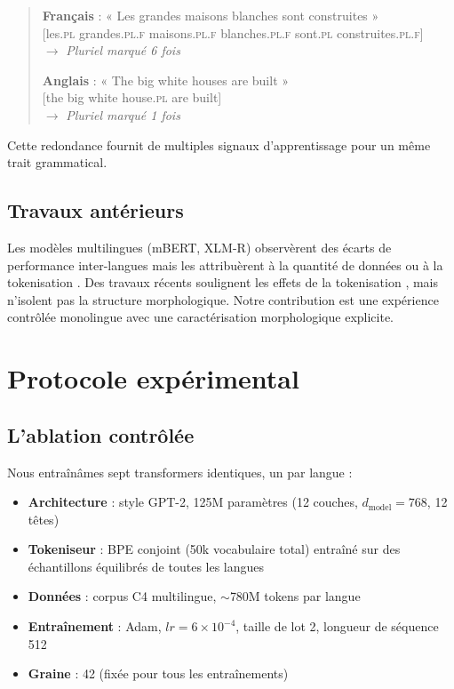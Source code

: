 \documentclass[11pt]{article}
\begin{document}
\begin{quote}
\textbf{Français} : « Les grandes maisons blanches sont construites »\\
\hspace*{1cm}[les.\textsc{pl} grandes.\textsc{pl.f} maisons.\textsc{pl.f} blanches.\textsc{pl.f} sont.\textsc{pl} construites.\textsc{pl.f}]\\
\hspace*{1cm}$\rightarrow$ \textit{Pluriel marqué 6 fois}

\textbf{Anglais} : « The big white houses are built »\\
\hspace*{1cm}[the big white house.\textsc{pl} are built]\\
\hspace*{1cm}$\rightarrow$ \textit{Pluriel marqué 1 fois}
\end{quote}

Cette redondance fournit de multiples signaux d'apprentissage pour un même trait grammatical.

\subsection{Travaux antérieurs}

Les modèles multilingues (mBERT, XLM-R) observèrent des écarts de performance inter-langues mais les attribuèrent à la quantité de données ou à la tokenisation \citep{conneau2020unsupervised}. Des travaux récents soulignent les effets de la tokenisation \citep{rust2021good}, mais n'isolent pas la structure morphologique. Notre contribution est une expérience contrôlée monolingue avec une caractérisation morphologique explicite.

\section{Protocole expérimental}

\subsection{L'ablation contrôlée}

Nous entraînâmes sept transformers identiques, un par langue :

\begin{itemize}
    \item \textbf{Architecture} : style GPT-2, 125M paramètres (12 couches, $d_{\text{model}}=768$, 12 têtes)
    \item \textbf{Tokeniseur} : BPE conjoint (50k vocabulaire total) entraîné sur des échantillons équilibrés de toutes les langues
    \item \textbf{Données} : corpus C4 multilingue, $\sim$780M tokens par langue
    \item \textbf{Entraînement} : Adam, $lr=6\times10^{-4}$, taille de lot 2, longueur de séquence 512
    \item \textbf{Graine} : 42 (fixée pour tous les entraînements)
\end{itemize}
\end{document}
